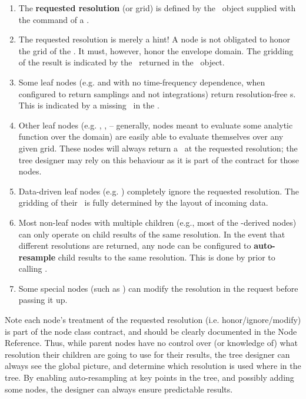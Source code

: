   \begin{enumerate}
  
  \item The {\bf requested resolution} (or grid) is defined by the \Cells\
  object supplied with the  command of a \Request.

  \item The requested resolution is merely a hint! A node is not obligated to
  honor the grid of the \Cells. It must, however, honor the envelope domain.
  The gridding of the result is indicated by the \Cells\ returned in the
  \Result\ object.
  
  \item Some leaf nodes (e.g.  and  with no time-frequency
  dependence, when configured to return samplings and not integrations) return
  resolution-free \Result{}s. This is indicated by a missing \Cells\ in the
  \Result. 

  \item Other leaf nodes (e.g. , ,  -- generally,
  nodes meant to evaluate some analytic function over the domain) are easily
  able to evaluate themselves over any given grid. These nodes will always
  return a \Result\ at the requested resolution; the tree designer may rely on
  this behaviour as it is part of the contract for those nodes.

  \item Data-driven leaf nodes (e.g. ) completely ignore the
  requested resolution. The gridding of their \Result\ is fully determined by
  the layout of incoming data.

  \item Most non-leaf nodes with multiple children (e.g., most of the
  \qq{Function}-derived nodes) can only operate on child results of the same
  resolution. In the event that different resolutions are returned, any node
  can be configured to {\bf auto-resample} child results to the same
  resolution. This is done by \qq{Node::execute()} prior to calling
  \qq{getResult()}.

  \item Some special nodes (such as ) can modify the resolution in
  the request before passing it up.
  
  \end{enumerate}
  
  Note each node's treatment of the requested resolution (i.e.
  honor/ignore/modify) is part of the node class contract, and should be
  clearly documented in the Node Reference. Thus, while parent nodes have no
  control over (or knowledge of) what resolution their children are going to
  use for their results, the tree designer can always see the global picture,
  and determine which resolution is used where in the tree. By enabling
  auto-resampling at key points in the tree, and possibly adding some
  \qq{ModRes} nodes, the designer can always ensure predictable results.
  
